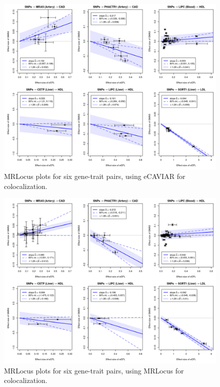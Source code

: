 \documentclass[11pt]{article}
\begin{document}

\begin{figure}[!ht]
  \centering
  \includegraphics[width=\textwidth]{figs/real_loci_ecav-mrlocus.png}
  \caption{MRLocus plots for six gene-trait pairs, using eCAVIAR for colocalization.}
\end{figure}

\begin{figure}[!ht]
  \centering
  \includegraphics[width=\textwidth]{figs/real_loci_mrlocus.png}
  \caption{MRLocus plots for six gene-trait pairs, using MRLocus for colocalization.}
\end{figure}
\end{document}
